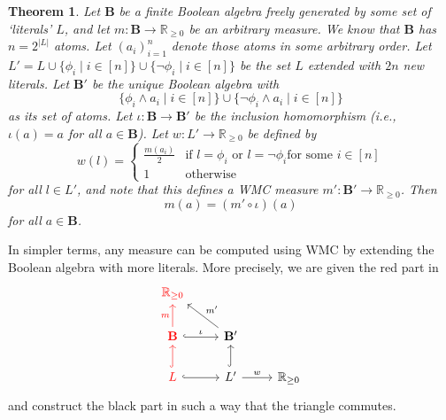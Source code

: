 \documentclass{article}
\newtheorem{theorem}{Theorem}
\theoremstyle{definition}
\theoremstyle{remark}
\begin{document}
\begin{theorem} \label{thm:extension} %
  Let $\mathbf{B}$ be a finite Boolean algebra freely generated by some set of
  `literals' $L$, and let $m\colon \mathbf{B} \to \mathbb{R}_{\ge 0}$ be an
  arbitrary measure. We know that $\mathbf{B}$ has $n = 2^{|L|}$ atoms. Let
  $(a_i)_{i=1}^n$ denote those atoms in some arbitrary order. Let $L' = L \cup
  \{ \phi_i \mid i \in [n] \} \cup \{ \neg \phi_i \mid i \in [n] \}$ be the set
  $L$ extended with $2n$ new literals. Let $\mathbf{B'}$ be the unique Boolean
  algebra with
  \[
    \{ \phi_i \land a_i \mid i \in [n] \} \cup \{ \neg \phi_i \land a_i \mid i
    \in [n] \}
  \]
  as its set of atoms. Let $\iota\colon \mathbf{B} \to \mathbf{B'}$ be the inclusion
  homomorphism (i.e., $\iota(a) = a$ for all $a \in \mathbf{B}$). Let $w\colon L'
  \to \mathbb{R}_{\ge 0}$ be defined by
  \[
    w(l) = \begin{cases}
      \frac{m(a_i)}{2} & \text{if } l = \phi_i \text{ or } l = \neg\phi_i \text{
        for some } i \in [n] \\
      1 & \text{otherwise}
    \end{cases}
  \]
  for all $l \in L'$, and note that this defines a WMC measure $m'\colon \mathbf{B'}
  \to \mathbb{R}_{\ge 0}$. Then
  \[
    m(a) = (m' \circ \iota)(a)
  \]
  for all $a \in \mathbf{B}$.
\end{theorem}

In simpler terms, any measure can be computed using WMC by extending the Boolean
algebra with more literals. More precisely, we are given the red part in
\[
  \begin{tikzcd}
    \textcolor{red}{\mathbb{R}_{\ge 0}} & & \\
    \textcolor{red}{\mathbf{B}} \arrow[red]{u}{m} \ar[r,hookrightarrow,"\iota"]
    & \mathbf{B'} \arrow{lu}[swap]{m'} & \\
    \textcolor{red}{L} \ar[u,red,hookrightarrow] \ar[r,hookrightarrow] & L'
    \ar[u,hookrightarrow] \arrow{r}{w} & \mathbb{R}_{\ge 0}
  \end{tikzcd}
\]
and construct the black part in such a way that the triangle commutes.
\end{document}
